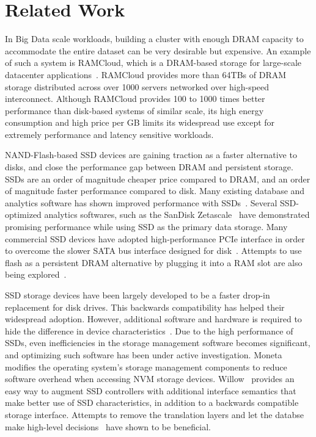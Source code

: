 
\section{Related Work}
\label{sec:related}


In Big Data scale workloads, building a cluster with enough DRAM capacity to
accommodate the entire dataset can be very desirable but expensive. An example
of such a system is RAMCloud, which is a DRAM-based storage for large-scale
datacenter applications~\cite{ramcloud, rumble_log_dram}.  RAMCloud provides more than 64TBs of DRAM
storage distributed across over 1000 servers networked over high-speed
interconnect. Although RAMCloud provides 100 to 1000 times better performance
than disk-based systems of similar scale, its high energy consumption and high
price per GB limits its widespread use except for extremely performance and
latency sensitive workloads.

NAND-Flash-based SSD devices are gaining traction as a faster alternative to
disks, and close the performance gap between DRAM and persistent storage.
SSDs are an order of magnitude cheaper price compared to DRAM,
and an order of magnitude faster performance compared to disk.
Many existing database and analytics software has shown
improved performance with SSDs~\cite{hadoopperf,ssdhadoop,ssddatabase}.
Several SSD-optimized analytics softwares, such as the SanDisk
Zetascale~\cite{zetascale} have demonstrated promising
performance while using SSD as the primary data storage.
Many commercial SSD devices have adopted high-performance PCIe interface in
order to overcome the slower SATA bus interface designed for
disk~\cite{fusionio, violinmemory, intelnvme}. Attempts to
use flash as a persistent DRAM alternative by plugging it into a RAM slot
are also being explored~\cite{diablotechnology}. 

SSD storage devices have been largely developed to be a faster drop-in
replacement for disk drives. This backwards compatibility has helped their 
widespread adoption.  However, additional software and hardware is required to
hide the difference in device characteristics~\cite{ssddesigntradeoff}.  Due to the high performance of
SSDs, even inefficiencies in the storage management software becomes
significant, and optimizing such software has been under active investigation.
Moneta~\cite{ucsd_moneta} modifies the operating system's storage management
components to reduce software overhead when accessing NVM storage devices.
Willow~\cite{ucsd_willow} provides an easy way to augment SSD controllers with
additional interface semantics that make better use of SSD characteristics, in
addition to a backwards compatible storage interface.  Attempts to remove the
translation layers and let the databse make high-level decisions~\cite{noftl}
have shown to be beneficial. 

